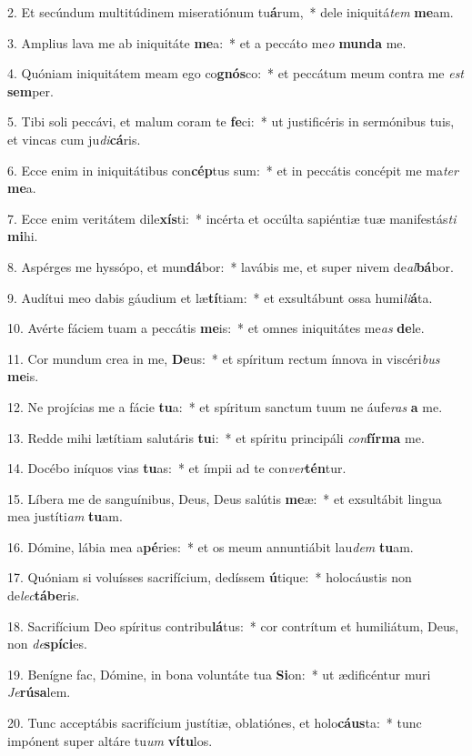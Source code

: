 2. Et secúndum multitúdinem miseratiónum tu\textbf{á}rum,~*  dele iniquitá\textit{tem} \textbf{me}am.\

3. Amplius lava me ab iniquitáte \textbf{me}a:~*  et a peccáto me\textit{o} \textbf{mun}\textbf{da} me.\

4. Quóniam iniquitátem meam ego co\textbf{gnós}co:~*  et peccátum meum contra me \textit{est} \textbf{sem}per.\

5. Tibi soli peccávi, et malum coram te \textbf{fe}ci:~*  ut justificéris in sermónibus tuis, et vincas cum ju\textit{di}\textbf{cá}ris.\

6. Ecce enim in iniquitátibus con\textbf{cép}tus sum:~*  et in peccátis concépit me ma\textit{ter} \textbf{me}a.\

7. Ecce enim veritátem dile\textbf{xís}ti:~*  incérta et occúlta sapiéntiæ tuæ manifestás\textit{ti} \textbf{mi}hi.\

8. Aspérges me hyssópo, et mun\textbf{dá}bor:~*  lavábis me, et super nivem de\textit{al}\textbf{bá}bor.\

9. Audítui meo dabis gáudium et læ\textbf{tí}tiam:~*  et exsultábunt ossa humi\textit{li}\textbf{á}ta.\

10. Avérte fáciem tuam a peccátis \textbf{me}is:~*  et omnes iniquitátes me\textit{as} \textbf{de}le.\

11. Cor mundum crea in me, \textbf{De}us:~*  et spíritum rectum ínnova in viscéri\textit{bus} \textbf{me}is.\

12. Ne projícias me a fácie \textbf{tu}a:~*  et spíritum sanctum tuum ne áufe\textit{ras} \textbf{a} me.\

13. Redde mihi lætítiam salutáris \textbf{tu}i:~*  et spíritu principáli \textit{con}\textbf{fír}\textbf{ma} me.\

14. Docébo iníquos vias \textbf{tu}as:~*  et ímpii ad te con\textit{ver}\textbf{tén}tur.\

15. Líbera me de sanguínibus, Deus, Deus salútis \textbf{me}æ:~*  et exsultábit lingua mea justíti\textit{am} \textbf{tu}am.\

16. Dómine, lábia mea a\textbf{pé}ries:~*  et os meum annuntiábit lau\textit{dem} \textbf{tu}am.\

17. Quóniam si voluísses sacrifícium, dedíssem \textbf{ú}tique:~*  holocáustis non de\textit{lec}\textbf{tá}\textbf{be}ris.\

18. Sacrifícium Deo spíritus contribu\textbf{lá}tus:~*  cor contrítum et humiliátum, Deus, non \textit{de}\textbf{spí}\textbf{ci}es.\

19. Benígne fac, Dómine, in bona voluntáte tua \textbf{Si}on:~*  ut ædificéntur muri \textit{Je}\textbf{rú}\textbf{sa}lem.\

20. Tunc acceptábis sacrifícium justítiæ, oblatiónes, et holo\textbf{cáus}ta:~*  tunc impónent super altáre tu\textit{um} \textbf{ví}\textbf{tu}los.\

